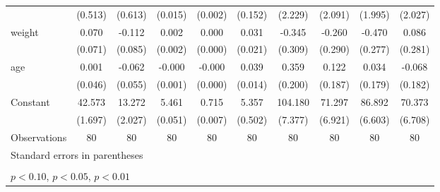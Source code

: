 \begin{table}[htbp]
\begin{tabular}{l*{9}{c}}
                    &     (0.513)         &     (0.613)         &     (0.015)         &     (0.002)         &     (0.152)         &     (2.229)         &     (2.091)         &     (1.995)         &     (2.027)         \\
\addlinespace
weight              &       0.070         &      -0.112         &       0.002         &       0.000         &       0.031         &      -0.345         &      -0.260         &      -0.470\sym{*}  &       0.086         \\
                    &     (0.071)         &     (0.085)         &     (0.002)         &     (0.000)         &     (0.021)         &     (0.309)         &     (0.290)         &     (0.277)         &     (0.281)         \\
\addlinespace
age                 &       0.001         &      -0.062         &      -0.000         &      -0.000         &       0.039\sym{***}&       0.359\sym{*}  &       0.122         &       0.034         &      -0.068         \\
                    &     (0.046)         &     (0.055)         &     (0.001)         &     (0.000)         &     (0.014)         &     (0.200)         &     (0.187)         &     (0.179)         &     (0.182)         \\
\addlinespace
Constant            &      42.573\sym{***}&      13.272\sym{***}&       5.461\sym{***}&       0.715\sym{***}&       5.357\sym{***}&     104.180\sym{***}&      71.297\sym{***}&      86.892\sym{***}&      70.373\sym{***}\\
                    &     (1.697)         &     (2.027)         &     (0.051)         &     (0.007)         &     (0.502)         &     (7.377)         &     (6.921)         &     (6.603)         &     (6.708)         \\
\midrule
Observations        &          80         &          80         &          80         &          80         &          80         &          80         &          80         &          80         &          80         \\
\bottomrule
\multicolumn{10}{l}{\footnotesize Standard errors in parentheses}\\
\multicolumn{10}{l}{\footnotesize  }\\
\multicolumn{10}{l}{\footnotesize \sym{*} \(p<0.10\), \sym{**} \(p<0.05\), \sym{***} \(p<0.01\)}\\
\end{tabular}
\end{table}
